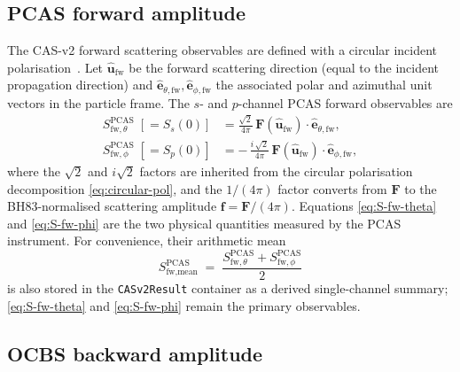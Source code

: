\documentclass[11pt,a4paper]{article}
\begin{document}
\subsection{PCAS forward amplitude}
\label{sec:S-fw}

The CAS-v2 forward scattering observables are defined with a circular
incident polarisation~\cite{Moteki2024}. Let
$\hat{\bm{u}}_{\text{fw}}$ be the forward scattering direction (equal
to the incident propagation direction) and
$\hat{\bm{e}}_{\theta,\text{fw}},\hat{\bm{e}}_{\phi,\text{fw}}$ the
associated polar and azimuthal unit vectors in the particle frame. The
$s$- and $p$-channel PCAS forward observables are
\begin{align}
  S_{\text{fw},\theta}^{\text{PCAS}}\;[=S_s(0)]
    &= \frac{\sqrt{2}}{4\pi}\,
       \bm{F}(\hat{\bm{u}}_{\text{fw}})\cdot\hat{\bm{e}}_{\theta,\text{fw}},
  \label{eq:S-fw-theta} \\
  S_{\text{fw},\phi}^{\text{PCAS}}\;[=S_p(0)]
    &= -\,\frac{i\,\sqrt{2}}{4\pi}\,
       \bm{F}(\hat{\bm{u}}_{\text{fw}})\cdot\hat{\bm{e}}_{\phi,\text{fw}},
  \label{eq:S-fw-phi}
\end{align}
where the $\sqrt{2}$ and $i\sqrt{2}$ factors are inherited from the
circular polarisation decomposition \eqref{eq:circular-pol}, and the
$1/(4\pi)$ factor converts from $\bm{F}$ to the BH83-normalised
scattering amplitude $\bm{f}=\bm{F}/(4\pi)$. Equations
\eqref{eq:S-fw-theta} and \eqref{eq:S-fw-phi} are the two physical
quantities measured by the PCAS instrument. For convenience, their
arithmetic mean
\begin{equation}
  S_{\text{fw,mean}}^{\text{PCAS}}
    \;=\; \frac{S_{\text{fw},\theta}^{\text{PCAS}}
                + S_{\text{fw},\phi}^{\text{PCAS}}}{2}
  \label{eq:S-fw-combined}
\end{equation}
is also stored in the \texttt{CASv2Result} container as a derived
single-channel summary; \eqref{eq:S-fw-theta} and \eqref{eq:S-fw-phi}
remain the primary observables.

\subsection{OCBS backward amplitude}
\label{sec:S-bk}
\end{document}
